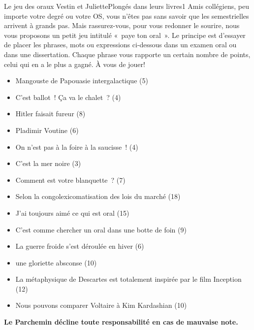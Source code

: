 \documentclass{parch}
\begin{document}
	\begin{parchArticle}{Le jeu des oraux}
		{Vestin et Juliette}{Plongés dans leurs livres}{1}
		Amis collégiens, peu importe votre degré ou votre OS, vous n’êtes pas sans savoir que les semestrielles arrivent à grands pas. Mais rassurez-vous, pour vous redonner le sourire, nous vous proposons un petit jeu intitulé « paye ton oral ». Le principe est d’essayer de placer les phrases, mots ou expressions ci-dessous dans un examen oral ou dans une dissertation. Chaque phrase vous rapporte un certain nombre de points, celui qui en a le plus a gagné.  À vous de jouer!
		
		\noindent\begin{itemize}[leftmargin=*]
			\item Mangouste de Papouasie intergalactique (5)
			\item C’est ballot ! Ça va le chalet ? (4)
			\item Hitler faisait fureur (8)
			\item Pladimir Voutine (6)
			\item On n’est pas à la foire à la saucisse ! (4)
			\item C’est la mer noire (3)
			\item Comment est votre blanquette ? (7)
			\item Selon la congolexicomatisation des lois du marché (18)
			\item J’ai toujours aimé ce qui est oral (15)
			\item C’est comme chercher un oral dans une botte de foin (9)
			\item La guerre froide s’est déroulée en hiver (6)
			\item une gloriette absconse (10)
			\item La métaphysique de Descartes est totalement inspirée par le film Inception (12)
			\item Nous pouvons comparer Voltaire à Kim Kardashian (10)
		\end{itemize}
		\vspace*{\baselineskip}
		\textbf{Le Parchemin décline toute responsabilité en cas de mauvaise note.}
	\end{parchArticle}
	
\end{document}
